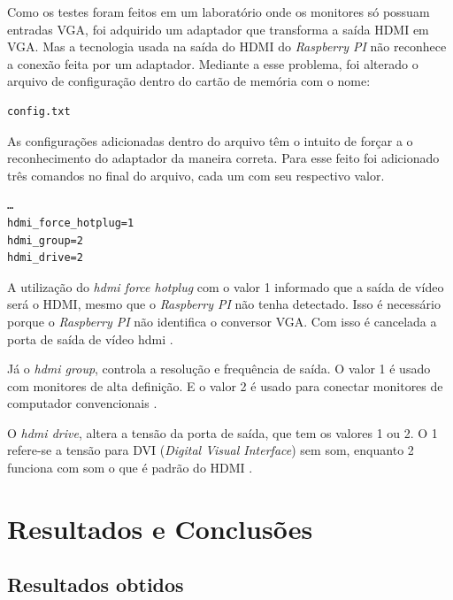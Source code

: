 \documentclass[
	12pt,				%
	openright,			%
	twoside,			%
	a4paper,			%
	chapter=TITLE,		%
	english,			%
	brazil				%
	]{abntex2}
\begin{document}
Como os testes foram feitos em um laboratório onde os monitores só possuam entradas VGA, foi adquirido um adaptador que transforma a saída HDMI em VGA. Mas a tecnologia usada na saída do HDMI do \textit{Raspberry PI} não reconhece a conexão feita por um adaptador. Mediante a esse problema, foi alterado o arquivo de configuração dentro do cartão de memória com o nome:
\begin{verbatim}
config.txt
\end{verbatim}
As configurações adicionadas dentro do arquivo têm o intuito de forçar a o reconhecimento do adaptador da maneira correta. Para esse feito foi adicionado três comandos no final do arquivo, cada um com seu respectivo valor. 
\begin{verbatim}
…
hdmi_force_hotplug=1
hdmi_group=2
hdmi_drive=2
\end{verbatim}
A utilização do \textit{hdmi force hotplug} com o valor 1 informado que a saída de vídeo será o HDMI, mesmo que o \textit{Raspberry PI} não tenha detectado. Isso é necessário porque o \textit{Raspberry PI} não identifica o conversor VGA. Com isso é cancelada a porta de saída de vídeo hdmi \cite{vga}.  

Já o \textit{hdmi group}, controla a resolução e frequência de saída. O valor 1 é usado com monitores de alta definição. E o valor 2 é usado para  conectar monitores de computador convencionais \cite{vga}. 

O \textit{hdmi drive}, altera a tensão da porta de saída, que tem os valores 1 ou 2. O 1 refere-se a tensão para DVI (\textit{Digital Visual Interface}) sem som, enquanto 2 funciona com som o que é padrão do HDMI \cite{vga}. 






\part{Resultados e Conclusões}

\chapter{Resultados obtidos}
\label{result}
\end{document}
